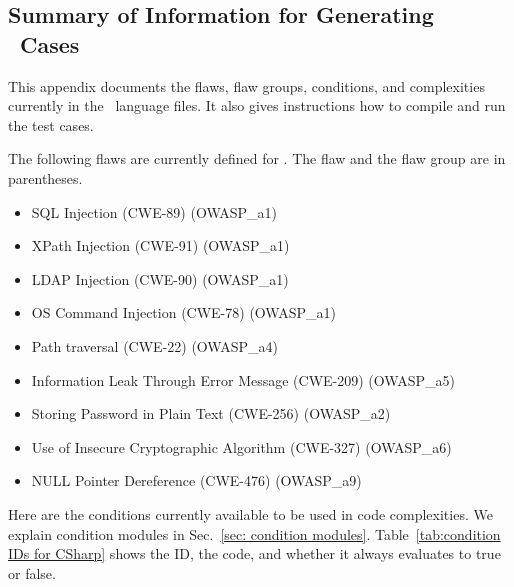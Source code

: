 \begin{appendices}

\section{Summary of Information for Generating \CSharp\ Cases}
\label{sec:CSharp language}

This appendix documents the flaws, flaw groups, conditions, and complexities
currently in the
\CSharp\ language files.
It also gives instructions how to compile and run the test cases.

The following flaws are currently defined for \CSharp.
The flaw and the flaw group are in parentheses.
\begin{itemize}[nosep]
    \item SQL Injection (CWE-89)
        (OWASP\_a1)
    \item XPath Injection (CWE-91)
        (OWASP\_a1)
    \item LDAP Injection (CWE-90)
        (OWASP\_a1)
    \item OS Command Injection (CWE-78)
        (OWASP\_a1)
    \item Path traversal (CWE-22)
        (OWASP\_a4)
    \item Information Leak Through Error Message (CWE-209)
        (OWASP\_a5)
    \item Storing Password in Plain Text (CWE-256)
        (OWASP\_a2)
    \item Use of Insecure Cryptographic Algorithm (CWE-327)
        (OWASP\_a6)
    \item NULL Pointer Dereference (CWE-476)
        (OWASP\_a9)
\end{itemize}

Here are the conditions currently available to be used in code complexities.
We explain condition modules in Sec.~\ref{sec: condition modules}.
Table~\ref{tab:condition IDs for CSharp} shows the ID, the code, and whether it
always evaluates to true or false.


\end{appendices}
